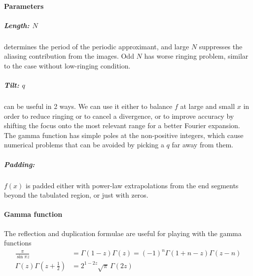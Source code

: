 \documentclass{article}
\begin{document}
\paragraph{Parameters}


\subparagraph{Length: $N$}
determines the period of the periodic approximant, and large $N$ suppresses
the aliasing contribution from the images.
Odd $N$ has worse ringing problem, similar to the case without low-ringing condition.


\subparagraph{Tilt: $q$}
can be useful in 2 ways.
We can use it either to balance $f$ at large and small $x$ in order to reduce
ringing or to cancel a divergence, or to improve accuracy by shifting the focus
onto the most relevant range for a better Fourier expansion.
The gamma function has simple poles at the non-positive integers, which cause
numerical problems that can be avoided by picking a $q$ far away from them.


\subparagraph{Padding:}
$f(x)$ is padded either with power-law extrapolations from the end segments
beyond the tabulated region, or just with zeros.


\paragraph{Gamma function}
The reflection and duplication formulae are useful for playing with the gamma functions
\begin{align}
    \frac\pi{\sin\pi z} &= \Gamma(1-z)\Gamma(z) = (-1)^n\Gamma(1+n-z)\Gamma(z-n)  \\
    \Gamma(z)\Gamma(z+\tfrac12) &= 2^{1-2z}\sqrt\pi\,\Gamma(2z)
\end{align}




\end{document}
